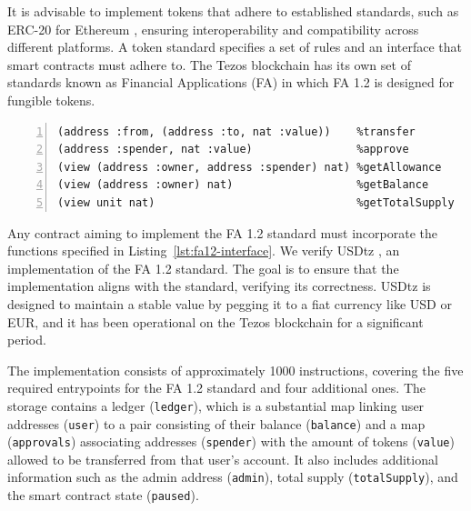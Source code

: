 \documentclass[runningheads]{llncs}
\begin{document}
It is advisable to implement tokens that adhere to established standards, such as ERC-20 \cite{erc} for Ethereum \cite{eth-whitepaper}, ensuring interoperability and compatibility across different platforms. A token standard specifies a set of rules and an interface that smart contracts must adhere to. The Tezos blockchain has its own set of standards known as Financial Applications (FA) in which FA 1.2 \cite{fa} is designed for fungible tokens.
\begin{lstlisting}[float=tp,captionpos=b,caption={FA 1.2 interface},label={lst:fa12-interface},numbers=left]
(address :from, (address :to, nat :value))    %transfer
(address :spender, nat :value)                %approve
(view (address :owner, address :spender) nat) %getAllowance
(view (address :owner) nat)                   %getBalance
(view unit nat)                               %getTotalSupply
\end{lstlisting}

Any contract aiming to implement the FA 1.2 standard must incorporate the functions specified in Listing~\ref{lst:fa12-interface}. We verify USDtz \cite{usdtzimplemetation,tzstatsusdtz}, an implementation of the FA 1.2 standard. The goal is to ensure that the implementation aligns with the standard, verifying its correctness. USDtz is designed to maintain a stable value by pegging it to a fiat currency like USD or EUR, and it has been operational on the Tezos blockchain for a significant period.

The implementation consists of approximately 1000 instructions, covering the five required entrypoints for the FA 1.2 standard and four additional ones. The storage contains a ledger (\lstinline/ledger/), which is a substantial map linking user addresses (\lstinline/user/) to a pair consisting of their balance (\lstinline/balance/) and a map (\lstinline/approvals/) associating addresses (\lstinline/spender/) with the amount of tokens (\lstinline/value/) allowed to be transferred from that user's account. It also includes additional information such as the admin address (\lstinline/admin/), total supply (\lstinline/totalSupply/), and the smart contract state (\lstinline/paused/).
\end{document}
